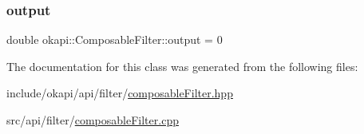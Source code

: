 \mbox{\label{classokapi_1_1ComposableFilter_ab956536a303c97c86fd2ec3af3c35eef}} 
\subsubsection{\texorpdfstring{output}{output}}
{\footnotesize\ttfamily double okapi\+::\+Composable\+Filter\+::output = 0\hspace{0.3cm}{\ttfamily [protected]}}



The documentation for this class was generated from the following files\+:\begin{DoxyCompactItemize}
\item 
include/okapi/api/filter/\mbox{\hyperlink{composableFilter_8hpp}{composable\+Filter.\+hpp}}\item 
src/api/filter/\mbox{\hyperlink{composableFilter_8cpp}{composable\+Filter.\+cpp}}\end{DoxyCompactItemize}
